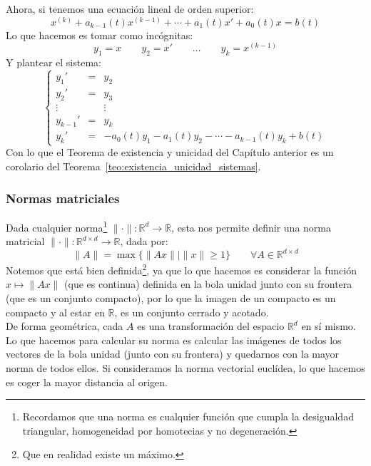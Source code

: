 \begin{coro}
Ahora, si tenemos una ecuación lineal de orden superior:
\begin{equation*}
    x^{(k)} + a_{k-1}(t) x^{(k-1)} + \cdots + a_1(t)x' + a_0(t)x = b(t)
\end{equation*}
Lo que hacemos es tomar como incógnitas:
\begin{equation*}
    y_1 = x \qquad y_2 = x' \qquad \ldots \qquad y_k = x^{(k-1)}
\end{equation*}
Y plantear el sistema:
\begin{equation*}
    \left\{\begin{array}{rcl}
            y_1' &=& y_2 \\
            y_2' &=& y_3 \\
            \vdots && \vdots \\
            y_{k-1}' &=& y_k \\
            y_k' &=& -a_0(t)y_1 -a_1(t) y_2 - \cdots - a_{k-1}(t)y_k + b(t)
    \end{array}\right.
\end{equation*}
Con lo que el Teorema de existencia y unicidad del Capítulo anterior es un corolario del Teorema~\ref{teo:existencia_unicidad_sistemas}.
\end{coro}

\subsubsection{Normas matriciales}
Dada cualquier norma\footnote{Recordamos que una norma es cualquier función que cumpla la desigualdad triangular, homogeneidad por homotecias y no degeneración.} $\|\cdot \|:\mathbb{R}^d\rightarrow\mathbb{R}$, esta nos permite definir una norma matricial $\|\cdot \|:\mathbb{R}^{d\times d}\rightarrow\mathbb{R}$, dada por:
\begin{equation*}
    \|A\| = \max\{\|Ax\| \mid \|x\|\geq 1\} \qquad \forall A\in \mathbb{R}^{d\times d}
\end{equation*}
Notemos que está bien definida\footnote{Que en realidad existe un máximo.}, ya que lo que hacemos es considerar la función $x\longmapsto \|Ax\|$ (que es continua) definida en la bola unidad junto con su frontera (que es un conjunto compacto), por lo que la imagen de un compacto es un compacto y al estar en $\mathbb{R}$, es un conjunto cerrado y acotado.\\

De forma geométrica, cada $A$ es una transformación del espacio $\mathbb{R}^d$ en sí mismo. Lo que hacemos para calcular su norma es calcular las imágenes de todos los vectores de la bola unidad (junto con su frontera) y quedarnos con la mayor norma de todos ellos. Si consideramos la norma vectorial euclídea, lo que hacemos es coger la mayor distancia al origen.


